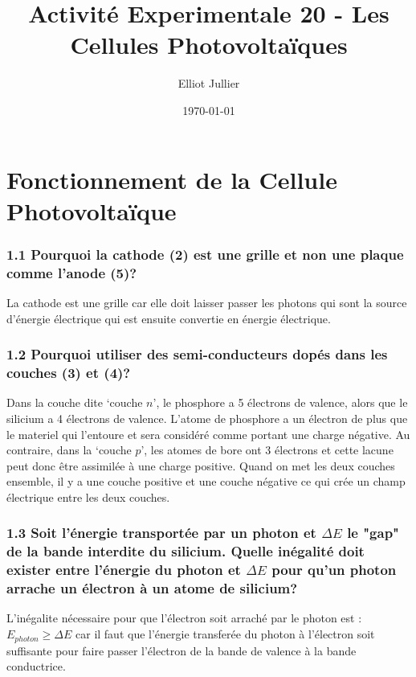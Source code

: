\documentclass[a4paper,12pt]{scrartcl}
\begin{document}
\title{Activité Experimentale 20 - Les Cellules Photovoltaïques}
\author{Elliot Jullier}
\date{\today}
\maketitle

\section{Fonctionnement de la Cellule Photovoltaïque}
\subsubsection*{1.1 Pourquoi la cathode (2) est une grille et non une plaque comme l'anode (5)?}


La cathode est une grille car elle doit laisser passer les photons qui sont 
la source d'énergie électrique qui est ensuite convertie en énergie électrique.
\subsubsection*{1.2 Pourquoi utiliser des semi-conducteurs dopés dans les couches (3) et (4)?}

Dans la couche dite `couche $n$', le phosphore a 5 électrons de valence, 
alors que le silicium a 4 électrons de valence. L'atome de phosphore a un électron de plus que le materiel qui l'entoure
et sera considéré comme portant une charge négative. 
Au contraire, dans la `couche $p$', les atomes de bore ont 3 électrons et  cette lacune
peut donc être assimilée à une charge positive. Quand on met les deux couches ensemble, il y a 
une couche positive et une couche négative ce qui crée un champ électrique entre les deux couches.

\subsubsection*{1.3 Soit l'énergie transportée par un photon et $\Delta E$ le "gap" de la bande interdite du silicium.
Quelle inégalité doit exister entre l'énergie du photon et $\Delta E$ pour qu'un photon arrache un 
électron à un atome de silicium?}

L'inégalite nécessaire pour que l'électron soit arraché par le photon est :
$E_{photon} \geq \Delta E$ car il faut que l'énergie transferée du photon à l'électron
soit suffisante pour faire passer l'électron de la bande de valence à la bande conductrice.
\end{document}
